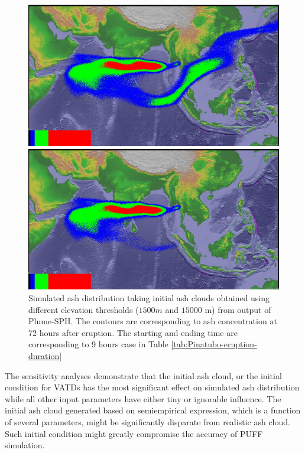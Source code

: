 \begin{figure}[!htb]
    \centering
    \begin{minipage}{.325\textwidth}
        \centering
        \includegraphics[width=0.99 \textwidth]{Chapter-7/Figures/199106180441-ash-9hr-cut1500}
    \end{minipage}%
    \begin{minipage}{.325 \textwidth}
        \centering
        \includegraphics[width=0.99 \textwidth]{Chapter-7/Figures/199106180441-ash-9hr-cut15000}
    \end{minipage}%
    \caption{Simulated ash distribution taking initial ash clouds obtained using different elevation thresholds ($1500 m$ and $15000$ m) from output of Plume-SPH. The contours are corresponding to ash concentration at 72 hours after eruption. The starting and ending time are corresponding to 9 hours case in Table \ref{tab:Pinatubo-eruption-duration}}
    \label{fig:PUFF-sensitivity-elevation-threshold}
\end{figure}

The sensitivity analyses demonstrate that the initial ash cloud, or the initial condition for VATDs has the most significant effect on simulated ash distribution while all other input parameters have either tiny or ignorable influence. The initial ash cloud generated based on semiempirical expression, which is a function of several parameters, might be significantly disparate from realistic ash cloud. Such initial condition might greatly compromise the accuracy of PUFF simulation.


